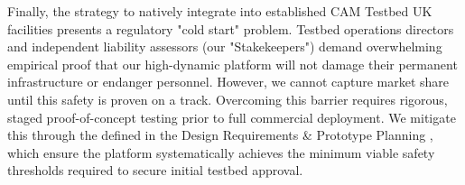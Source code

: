 Finally, the strategy to natively integrate into established CAM Testbed UK facilities presents a regulatory "cold start" problem. Testbed operations directors and independent liability assessors (our "Stakekeepers") demand overwhelming empirical proof that our high-dynamic platform will not damage their permanent infrastructure or endanger personnel. However, we cannot capture market share until this safety is proven on a track. Overcoming this barrier requires rigorous, staged proof-of-concept testing prior to full commercial deployment. We mitigate this through the defined in the Design Requirements \& Prototype Planning %
, which ensure the platform systematically achieves the minimum viable safety thresholds required to secure initial testbed approval.



